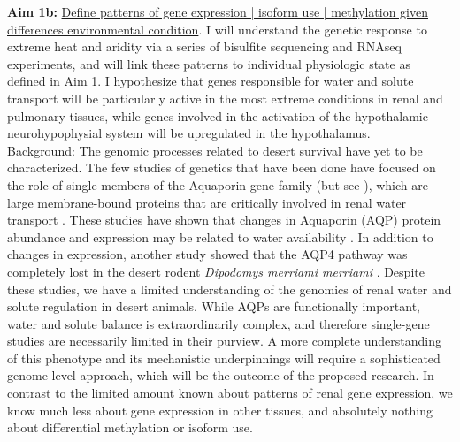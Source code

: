 \documentclass[11pt]{article}
\begin{document}
\noindent \textbf{Aim 1b:} \ul{Define patterns of gene expression | isoform use | methylation given differences environmental condition}. {I will understand the genetic response to extreme heat and aridity via a series of bisulfite sequencing and RNAseq experiments, and will link these patterns to individual physiologic state as defined in Aim 1.} I hypothesize that genes responsible for water and solute transport will be particularly active in the most extreme conditions in renal and pulmonary tissues, while genes involved in the activation of the hypothalamic-neurohypophysial system will be upregulated in the hypothalamus.\\

Background: The genomic processes related to desert survival have yet to be characterized. The few studies of genetics that have been done have focused on the role of single members of the Aquaporin gene family (but see \cite{Bartolo:2007hy}), which are large membrane-bound proteins that are critically involved in renal water transport \citep{Kwon:2009bv,Verkman:2002ww,Brown:1995vo,Nielsen:1995cb}. These studies have shown that changes in Aquaporin (AQP) protein abundance and expression may be related to water availability \citep{Boselt:2009fb, Gallardo:2005fm,Bozinovic:2003eg}. In addition to changes in expression, another study showed that the AQP4 pathway was completely lost in the desert rodent \textit{Dipodomys merriami merriami} \citep{Huang:2001ti}. Despite these studies, we have a limited understanding of the genomics of renal water and solute regulation in desert animals. While AQPs are functionally important, water and solute balance is extraordinarily complex, and therefore single-gene studies are necessarily limited in their purview. A more complete understanding of this phenotype and its mechanistic underpinnings will require a sophisticated genome-level approach, which will be the outcome of the proposed research. In contrast to the limited amount known about patterns of renal gene expression, we know much less about gene expression in other tissues, and absolutely nothing about differential methylation or isoform use. 
\end{document}
